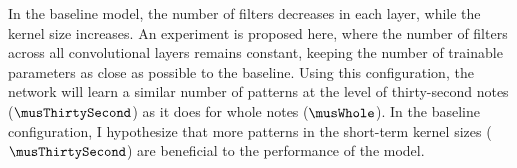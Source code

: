 
In the baseline model, the number of filters decreases in
each layer, while the kernel size increases. An experiment
is proposed here, where the number of filters across all
convolutional layers remains constant, keeping the number of
trainable parameters as close as possible to the baseline.
Using this configuration, the network will learn a similar
number of patterns at the level of thirty-second notes
($\musThirtySecond$) as it does for whole notes
($\musWhole$). In the baseline configuration, I hypothesize
that more patterns in the short-term kernel sizes
($\musThirtySecond$) are beneficial to the performance of
the model.
